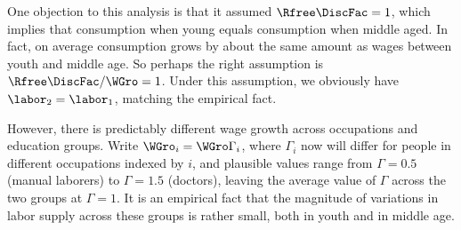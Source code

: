 
One objection to this analysis is that it assumed $\Rfree\DiscFac=1$, which
implies that consumption when young equals consumption when middle
aged.  In fact, on average consumption grows by about the same amount
as wages between youth and middle age.  So perhaps the right
assumption is $\Rfree\DiscFac/\WGro = 1$.  Under this assumption, we obviously
have $\labor_{2}=\labor_{1}$, matching the empirical fact.

However, there is predictably different wage growth across occupations
and education groups.  Write $\WGro_{i}=\WGro\Gamma_{i}$, where $\Gamma_{i}$ now
will differ for people in different occupations indexed by $i$, and plausible values
range from $\Gamma=0.5$ (manual laborers) to $\Gamma=1.5$ (doctors),
leaving the average value of $\Gamma$ across the two groups at $\Gamma=1$.
It is an empirical fact that the magnitude of variations in labor
supply across these groups is rather small, both in youth and in middle age.

